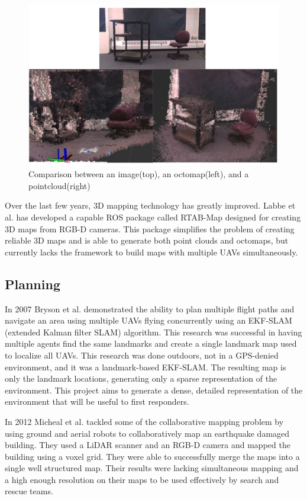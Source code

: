 \documentclass[12pt, letterpaper]{article}
\begin{document}
\begin{figure}[h] %
	\centering
	\includegraphics[trim = 0mm 0mm 0mm 0mm,clip,width=6.5in]{voxel.png}
	\caption{Comparison between an image(top), an octomap(left), and a pointcloud(right)}
	\label{fig:voxel}
\end{figure}

Over the last few years, 3D mapping technology has greatly improved. Labbe et al. \cite{Labbe2011a} \cite{Labbe2013} has developed a capable ROS package called RTAB-Map designed for creating 3D maps from RGB-D cameras. This package simplifies the problem of creating reliable 3D maps and is able to generate both point clouds and octomaps, but currently lacks the framework to build maps with multiple UAVs simultaneously.

\subsection{Planning}
In 2007 Bryson et al. \cite{Bryson2007} demonstrated the ability to plan multiple flight paths and navigate an area using multiple UAVs flying concurrently using an EKF-SLAM (extended Kalman filter SLAM) algorithm. This research was successful in having multiple agents find the same landmarks and create a single landmark map used to localize all UAVs. This research was done outdoors, not in a GPS-denied environment, and it was a landmark-based EKF-SLAM. The resulting map is only the landmark locations, generating only a sparse representation of the environment. This project aims to generate a dense, detailed representation of the environment that will be useful to first responders.
 
In 2012 Micheal et al. \cite{Michael2012} tackled some of the collaborative mapping problem by using ground and aerial robots to collaboratively map an earthquake damaged building. They used a LiDAR scanner and an RGB-D camera and mapped the building using a voxel grid. They were able to successfully merge the maps into a single well structured map. Their results were lacking simultaneous mapping and a high enough resolution on their maps to be used effectively by search and rescue teams.   
\end{document}
